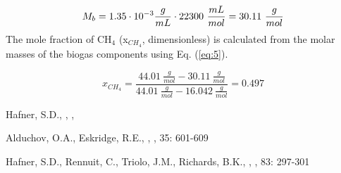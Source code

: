 \documentclass[]{article}
\begin{document}
\begin{equation*}
  \centering
  M_b= 1.35 \cdot 10^{-3} \frac{g}{mL} \cdot 22300\ \frac{mL}{mol} = 30.11\ \frac{g}{mol}
\end{equation*}
The mole fraction of CH$_4$ (x$_{CH_4}$, dimensionless) is calculated from the molar masses of the biogas components using Eq. (\ref{eq:5}). 

\begin{equation*}
  x_{CH_4}=\frac{44.01\ \frac{g}{mol}-30.11\ \frac{g}{mol}}{44.01\ \frac{g}{mol}-16.042\ \frac{g}{mol}} = 0.497
\end{equation*}


\begin{thebibliography}{1}

Hafner, S.D.,
    ,
    ,

Alduchov, O.A., Eskridge, R.E.,   
    ,
    , 
     35: 601-609

Hafner, S.D., Rennuit, C., Triolo, J.M., Richards, B.K.,
    ,
    ,
         83: 297-301

\end{thebibliography}
\end{document}
